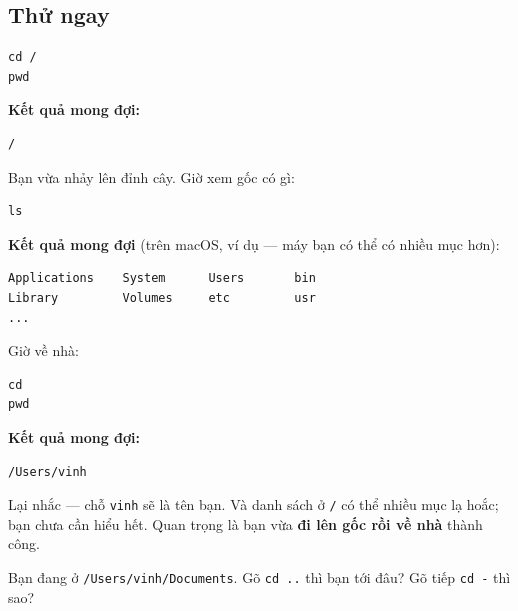 \documentclass[12pt,a4paper]{article}
\begin{document}
\subsection{Thử ngay}

\begin{labbox}
\begin{codebox}
\begin{verbatim}
cd /
pwd
\end{verbatim}
\end{codebox}
\textbf{Kết quả mong đợi:}
\begin{codebox}
\begin{verbatim}
/
\end{verbatim}
\end{codebox}
Bạn vừa nhảy lên đỉnh cây. Giờ xem gốc có gì:
\begin{codebox}
\begin{verbatim}
ls
\end{verbatim}
\end{codebox}
\textbf{Kết quả mong đợi} (trên macOS, ví dụ --- máy bạn có thể có nhiều mục hơn):
\begin{codebox}
\begin{verbatim}
Applications    System      Users       bin
Library         Volumes     etc         usr
...
\end{verbatim}
\end{codebox}
Giờ về nhà:
\begin{codebox}
\begin{verbatim}
cd
pwd
\end{verbatim}
\end{codebox}
\textbf{Kết quả mong đợi:}
\begin{codebox}
\begin{verbatim}
/Users/vinh
\end{verbatim}
\end{codebox}
\end{labbox}

\begin{notebox}[title={Trấn an}]
Lại nhắc --- chỗ \texttt{vinh} sẽ là tên bạn. Và danh sách ở \texttt{/} có thể nhiều mục lạ hoắc; bạn chưa cần hiểu hết. Quan trọng là bạn vừa \textbf{đi lên gốc rồi về nhà} thành công.
\end{notebox}

\begin{checkbox}[title={Tự kiểm tra 4}]
Bạn đang ở \texttt{/Users/vinh/Documents}. Gõ \texttt{cd ..} thì bạn tới đâu? Gõ tiếp \texttt{cd -} thì sao?
\end{checkbox}
\end{document}
